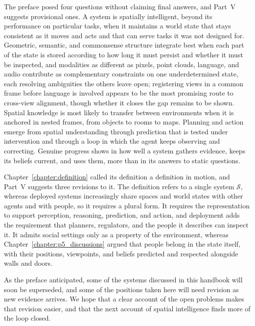 The preface posed four questions without claiming final answers, and Part~V suggests provisional ones.
A system is spatially intelligent, beyond its performance on particular tasks, when it maintains a world state that stays consistent as it moves and acts and that can serve tasks it was not designed for.
Geometric, semantic, and commonsense structure integrate best when each part of the state is stored according to how long it must persist and whether it must be inspected, and modalities as different as pixels, point clouds, language, and audio contribute as complementary constraints on one underdetermined state, each resolving ambiguities the others leave open; registering views in a common frame before language is involved appears to be the most promising route to cross-view alignment, though whether it closes the gap remains to be shown.
Spatial knowledge is most likely to transfer between environments when it is anchored in nested frames, from objects to rooms to maps.
Planning and action emerge from spatial understanding through prediction that is tested under intervention and through a loop in which the agent keeps observing and correcting.
Genuine progress shows in how well a system gathers evidence, keeps its beliefs current, and uses them, more than in its answers to static questions.

Chapter~\ref{chapter:definition} called its definition a definition in motion, and Part~V suggests three revisions to it.
The definition refers to a single system $\mathcal{S}$, whereas deployed systems increasingly share spaces and world states with other agents and with people, so it requires a plural form.
It requires the representation to support perception, reasoning, prediction, and action, and deployment adds the requirement that planners, regulators, and the people it describes can inspect it.
It admits social settings only as a property of the environment, whereas Chapter~\ref{chapter:p5_discussions} argued that people belong in the state itself, with their positions, viewpoints, and beliefs predicted and respected alongside walls and doors.

As the preface anticipated, some of the systems discussed in this handbook will soon be superseded, and some of the positions taken here will need revision as new evidence arrives.
We hope that a clear account of the open problems makes that revision easier, and that the next account of spatial intelligence finds more of the loop closed.
